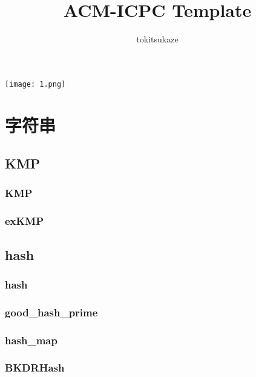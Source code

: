 \documentclass[a4paper,twocolumn]{article}
\title{ACM-ICPC Template}
\author {tokitsukaze}
\begin{document}
\begin{titlepage}
\maketitle
\vspace*{50pt}
\begin{center}

\texttt{[image: 1.png]}
\end{center}
\end{titlepage}
\newpage
\pagestyle{empty}
\renewcommand{\contentsname}{目录}
\tableofcontents
\newpage\clearpage
\newpage
\pagestyle{fancy}
\setcounter{page}{1}

\section{字符串}
\subsection{KMP}
\subsubsection{KMP}

\subsubsection{exKMP}

\subsection{hash}
\subsubsection{hash}

\subsubsection{good\_hash\_prime}

\subsubsection{hash\_map}

\subsubsection{BKDRHash}

\end{document}
